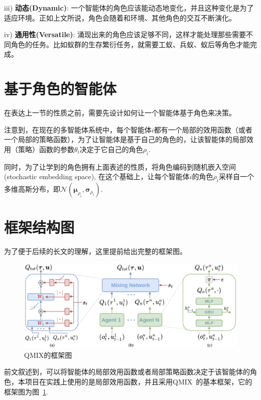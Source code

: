 iii) \textbf{动态(Dynamic)}: 一个智能体的角色应该能动态地变化，并且这种变化是为了适应环境。正如上文所说，角色会随着和环境、其他角色的交互不断演化。

iv) \textbf{通用性(Versatile)}: 涌现出来的角色应该足够不同，这样才能处理那些需要不同角色的任务。比如蚁群的生存繁衍任务，就需要工蚁、兵蚁、蚁后等角色才能完成。


\section{基于角色的智能体}
在表达上一节的性质之前，需要先设计如何让一个智能体基于角色来决策。

注意到，在现在的多智能体系统中，每个智能体$i$都有一个局部的效用函数（或者一个局部的策略函数），为了让智能体是基于自己的角色的，让该智能体的局部效用（策略）函数的参数$\theta_i$决定于它自己的角色$\rho_i$. 

同时，为了让学到的角色拥有上面表述的性质，将角色编码到随机嵌入空间(stochastic embedding space), 在这个基础上，让每个智能体$i$的角色$\rho_i$采样自一个多维高斯分布，即$\mathcal{N}(\bm{\mu}_{\rho_i}, \bm{\sigma}_{\rho_i})$.

\section{框架结构图}
为了便于后续的长文的理解，这里提前给出完整的框架图。

\begin{figure}
    \centering
    \includegraphics[width=0.8\linewidth]{figures/framework/qmix_framework.png}
    \caption{QMIX的框架图}
    \label{fig:qmix_framework}
\end{figure}

前文叙述到，可以将智能体的局部效用函数或者局部策略函数决定于该智能体的角色，本项目在实践上使用的是局部效用函数，并且采用QMIX~\cite{rashid2018qmix}的基本框架，它的框架图为图~\ref{fig:qmix_framework}.

